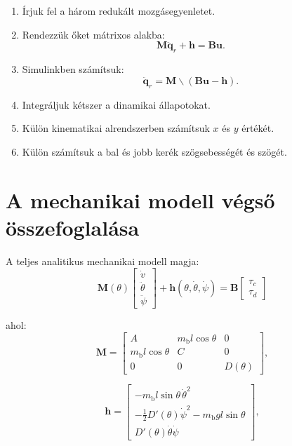 \documentclass[12pt,a4paper]{article}
\newcommand{\mbody}{m_{\mathrm{b}}}
\begin{document}
\begin{enumerate}[leftmargin=2em]
\[		\qquad
		\tau_d=\frac{\tau_R-\tau_L}{2}.
		\]
		\item Írjuk fel a három redukált mozgásegyenletet.
		\item Rendezzük őket mátrixos alakba:
		\[
		\bm M\ddot{\bm q}_r+\bm h=\bm B\bm u.
		\]
		\item Simulinkben számítsuk:
		\[
		\ddot{\bm q}_r=\bm M\backslash(\bm B\bm u-\bm h).
		\]
		\item Integráljuk kétszer a dinamikai állapotokat.
		\item Külön kinematikai alrendszerben számítsuk $x$ és $y$ értékét.
		\item Külön számítsuk a bal és jobb kerék szögsebességét és szögét.
	\end{enumerate}
	
	\section{A mechanikai modell végső összefoglalása}
	
	A teljes analitikus mechanikai modell magja:
	\begin{equation}
		\boxed{
			\bm M(\theta)
			\begin{bmatrix}
				\dot v\\
				\ddot\theta\\
				\ddot\psi
			\end{bmatrix}
			+
			\bm h(\theta,\dot\theta,\dot\psi)
			=
			\bm B
			\begin{bmatrix}
				\tau_c\\
				\tau_d
			\end{bmatrix}
		}
	\end{equation}
	
	ahol:
	\begin{equation}
		\bm M=
		\begin{bmatrix}
			A & \mbody l\cos\theta & 0\\
			\mbody l\cos\theta & C & 0\\
			0 & 0 & D(\theta)
		\end{bmatrix},
	\end{equation}
	
	\begin{equation}
		\bm h=
		\begin{bmatrix}
			-\mbody l\sin\theta\,\dot\theta^2\\
			-\frac12D'(\theta)\dot\psi^2-\mbody gl\sin\theta\\
			D'(\theta)\dot\theta\dot\psi
		\end{bmatrix},
	\end{equation}
	
\end{document}

